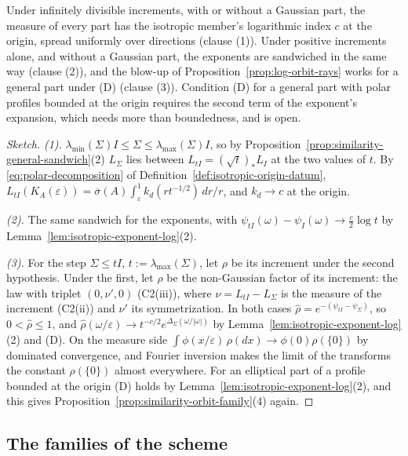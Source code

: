 Under infinitely divisible increments, with or without a Gaussian part, the \Levy{} measure of every
part has the isotropic member's logarithmic index $c$ at the origin, spread uniformly over directions
(clause (1)). Under positive increments alone, and without a Gaussian part, the exponents are
sandwiched in the same way (clause (2)), and the blow-up of Proposition~\ref{prop:log-orbit-rays} works
for a general part under (D) (clause (3)). Condition (D) for a general part with polar profiles bounded
at the origin requires the second term of the exponent's expansion, which needs more than boundedness,
and is open.

\begin{proof}[Sketch]
\emph{(1).} $\lambda_{\min}(\Sigma)I \le \Sigma \le \lambda_{\max}(\Sigma)I$, so by
Proposition~\ref{prop:similarity-general-sandwich}(2) $L_\Sigma$ lies between $L_{tI} = (\sqrt t)_*L_I$ at the
two values of $t$. By \ref{eq:polar-decomposition} of Definition~\ref{def:isotropic-origin-datum},
$L_{tI}(K_A(\varepsilon)) = \overline\sigma(A)\int_\varepsilon^1k_d(rt^{-1/2})\,dr/r$, and $k_d \to c$ at the
origin.

\emph{(2).} The same sandwich for the exponents, with $\psi_{tI}(\omega) - \psi_I(\omega) \to \tfrac c2\log t$ by
Lemma~\ref{lem:isotropic-exponent-log}(2).

\emph{(3).} For the step $\Sigma \le tI$, $t := \lambda_{\max}(\Sigma)$, let $\rho$ be its increment under the
second hypothesis. Under the first, let $\rho$ be the non-Gaussian factor of its increment: the law with
triplet $(0, \nu', 0)$ (C2(iii)), where $\nu = L_{tI} - L_\Sigma$ is the \Levy{} measure of the increment
(C2(ii)) and $\nu'$ its symmetrization. In both cases $\widehat\rho = e^{-(\psi_{tI} - \psi_\Sigma)}$, so
$0 < \widehat\rho \le 1$, and $\widehat\rho(\omega/\varepsilon) \to t^{-c/2}e^{\Delta_\Sigma(\omega/|\omega|)}$ by
Lemma~\ref{lem:isotropic-exponent-log}(2) and (D). On the measure side
$\int\phi(x/\varepsilon)\,\rho(dx) \to \phi(0)\rho(\{0\})$ by dominated convergence, and Fourier inversion
makes the limit of the transforms the constant $\rho(\{0\})$ almost everywhere. For an elliptical part of a
profile bounded at the origin (D) holds by Lemma~\ref{lem:isotropic-exponent-log}(2), and this gives
Proposition~\ref{prop:similarity-orbit-family}(4) again.
\end{proof}

\subsection{The families of the scheme}\label{app:similarity-scheme}

